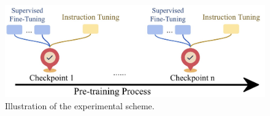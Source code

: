 \begin{figure}[t]
  \includegraphics[width=\columnwidth]{figures/teaser.jpeg}
  \caption{Illustration of the experimental scheme.}
  \label{fig:experiment-illu}
\end{figure}
